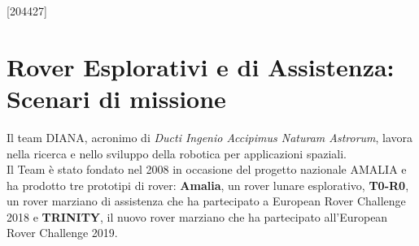 \documentclass[%
corpo=11pt,
twoside,
 stile=classica,
oldstyle,
greek,%
]{toptesi}
\begin{document}



\begin{frontespizio}
\nomeateneo{}%
\FacoltaDi{}%
\facolta[III]{}%
\renewcommand*\IDlabel{\\\quad Matricola: }%
[204427]%
\end{frontespizio}



\ringraziamenti %




\mainmatter
\indici
\chapter{Rover Esplorativi e di Assistenza: Scenari di missione}
Il team DIANA, acronimo di  \textit{Ducti Ingenio Accipimus Naturam Astrorum}, lavora nella ricerca e nello sviluppo della robotica per applicazioni spaziali.\\
Il Team è stato fondato nel 2008 in occasione del progetto nazionale AMALIA e ha prodotto tre prototipi di rover: \textbf{Amalia}, un rover lunare esplorativo, \textbf{T0-R0}, un rover marziano di assistenza che ha partecipato a European Rover Challenge 2018 e \textbf{TRINITY}, il nuovo rover marziano che ha partecipato all'European Rover Challenge 2019.
\end{document}
